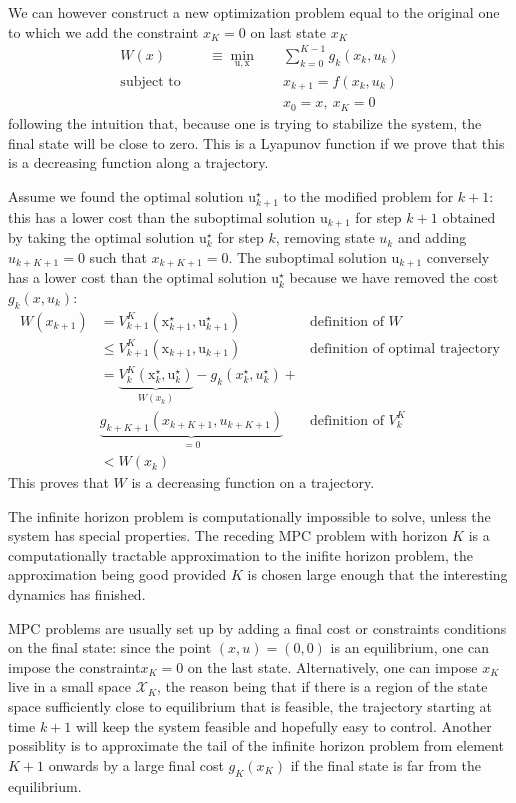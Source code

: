 \documentclass[11pt]{report}
\newcommand{\bs}[1]{\boldsymbol{#1}}
\newcommand{\bsu}{\bs{\mathrm{u}}}
\newcommand{\bsx}{\bs{\mathrm{x}}}
\begin{document}
We can however construct a new optimization problem equal to the original one to which we add the constraint $x_K=0$ on last state $x_K$
\begin{equation}
  \label{eq:lyapunov-tracking-MPC}
  \begin{aligned}
    W(x) \qquad\quad\equiv \min_{\bsu,\bsx} &\quad \sum_{k=0}^{K-1} g_k(x_k,u_k) \\
    \text{subject to } &\quad x_{k+1} = f(x_k,u_k) \\
                                            &\quad  x_0 = x,\ x_K = 0
  \end{aligned}
\end{equation}
following the intuition that, because one is trying to stabilize the system, the final state will be close to zero. This is a Lyapunov function if we prove that this is a decreasing function along a trajectory.

Assume we found the optimal solution $\bsu_{k+1}^\star$ to the modified problem for $k+1$: this has a lower cost than the suboptimal solution $\bsu_{k+1}$ for step $k+1$ obtained by taking the optimal solution $\bsu_k^\star$ for step $k$, removing state $u_k$ and adding $u_{k+K+1} = 0$ such that $x_{k+K+1} = 0$. The suboptimal solution $\bsu_{k+1}$ conversely has a lower cost than the optimal solution $\bsu_k^\star$ because we have removed the cost $g_k(x,u_k)$:
\begin{align*}
  W(x_{k+1}) &= V_{k+1}^K(\bsx_{k+1}^\star, \bsu_{k+1}^\star) & \text{definition of $W$} \\
             & \leq V_{k+1}^K(\bsx_{k+1}, \bsu_{k+1}) & \text{definition of optimal trajectory} \\
             & = \underbrace{V_k^K(\bsx_k^\star, \bsu_k^\star)}_{W(x_k)} - g_k(x_k^\star,u_k^\star) + \\
             & \underbrace{g_{k+K+1}(x_{k+K+1},u_{k+K+1})}_{=0} & \text{definition of $V_k^K$} \\
  & < W(x_k)
\end{align*}
This proves that $W$ is a decreasing function on a trajectory.

The infinite horizon problem is computationally impossible to solve, unless the system has special properties. The receding MPC problem with horizon $K$ is a computationally tractable approximation to the inifite horizon problem, the approximation being good provided $K$ is chosen large enough that the interesting dynamics has finished.

MPC problems are usually set up by adding a final cost or constraints conditions on the final state: since the point $(x,u)=(0,0)$ is an equilibrium, one can impose the constraint$x_K=0$ on the last state. Alternatively, one can impose $x_K$ live in a small space $\mathcal{X}_K$, the reason being that if there is a region of the state space sufficiently close to equilibrium that is feasible, the trajectory starting at time $k+1$ will keep the system feasible and hopefully easy to control. Another possiblity is to approximate the tail of the infinite horizon problem from element $K+1$ onwards by a large final cost $g_K(x_K)$ if the final state is far from the equilibrium.
\end{document}
